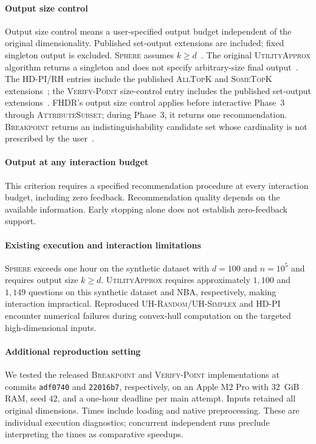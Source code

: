 \paragraph{Output size control}
Output size control means a user-specified output budget independent of the original dimensionality. Published set-output extensions are included; fixed singleton output is excluded. \textsc{Sphere} assumes $k\geq d$~\cite{XW18}. The original \textsc{UtilityApprox} algorithm returns a singleton and does not specify arbitrary-size final output~\cite{NL12}. The \textsc{HD-PI}/\textsc{RH} entries include the published \textsc{AllTopK} and \textsc{SomeTopK} extensions~\cite{WWX21}; the \textsc{Verify-Point} size-control entry includes the published set-output extensions~\cite{CW23}. FHDR's output size control applies before interactive Phase~3 through \textsc{AttributeSubset}; during Phase~3, it returns one recommendation. \textsc{Breakpoint} returns an indistinguishability candidate set whose cardinality is not prescribed by the user~\cite{LA25}.

\paragraph{Output at any interaction budget}
This criterion requires a specified recommendation procedure at every interaction budget, including zero feedback. Recommendation quality depends on the available information. Early stopping alone does not establish zero-feedback support.

\paragraph{Existing execution and interaction limitations}
\textsc{Sphere} exceeds one hour on the synthetic dataset with $d=100$ and $n=10^5$ and requires output size $k\geq d$. \textsc{UtilityApprox} requires approximately $1{,}100$ and $1{,}149$ questions on this synthetic dataset and NBA, respectively, making interaction impractical. Reproduced \textsc{UH-Random}/\textsc{UH-Simplex} and \textsc{HD-PI} encounter numerical failures during convex-hull computation on the targeted high-dimensional inputs.

\paragraph{Additional reproduction setting}
We tested the released \textsc{Breakpoint} and \textsc{Verify-Point} implementations at commits \texttt{adf0740} and \texttt{22016b7}, respectively, on an Apple M2 Pro with $32$~GiB RAM, seed $42$, and a one-hour deadline per main attempt. Inputs retained all original dimensions. Times include loading and native preprocessing. These are individual execution diagnostics; concurrent independent runs preclude interpreting the times as comparative speedups.

